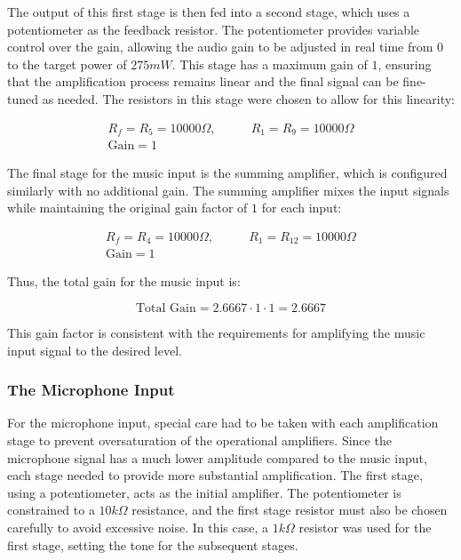 \documentclass[12pt]{article}
\begin{document}
The output of this first stage is then fed into a second stage, which uses a potentiometer as the feedback resistor. The potentiometer provides variable control over the gain, allowing the audio gain to be adjusted in real time from $0$ to the target power of $275mW$. This stage has a maximum gain of $1$, ensuring that the amplification process remains linear and the final signal can be fine-tuned as needed. The resistors in this stage were chosen to allow for this linearity:

\begin{align*}
	R_f = R_5 = 10000\Omega, \quad & \quad R_1 = R_9 = 10000\Omega \\
	\text{Gain} = 1
\end{align*}

The final stage for the music input is the summing amplifier, which is configured similarly with no additional gain. The summing amplifier mixes the input signals while maintaining the original gain factor of $1$ for each input:

\begin{align*}
	R_f = R_4 = 10000\Omega, \quad & \quad R_1 = R_{12} = 10000\Omega \\
	\text{Gain} = 1
\end{align*}

Thus, the total gain for the music input is:

\begin{equation}
	\text{Total Gain} = 2.6667 \cdot 1 \cdot 1 = 2.6667
\end{equation}

This gain factor is consistent with the requirements for amplifying the music input signal to the desired level.

\subsubsection{The Microphone Input}
For the microphone input, special care had to be taken with each amplification stage to prevent oversaturation of the operational amplifiers. Since the microphone signal has a much lower amplitude compared to the music input, each stage needed to provide more substantial amplification. The first stage, using a potentiometer, acts as the initial amplifier. The potentiometer is constrained to a $10k\Omega$ resistance, and the first stage resistor must also be chosen carefully to avoid excessive noise. In this case, a $1k\Omega$ resistor was used for the first stage, setting the tone for the subsequent stages.
\end{document}
